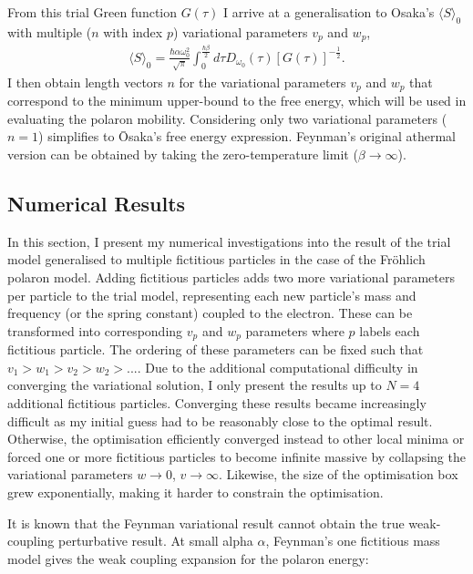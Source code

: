 From this trial Green function $G(\tau)$ I arrive at a generalisation to Osaka's $\langle S \rangle_0$ with multiple ($n$ with index $p$) variational parameters $v_{p}$ and $w_{p}$, 
\begin{equation}
\begin{gathered}
    \langle S \rangle_0 = \frac{\hbar \alpha \omega_0^2}{\sqrt{\pi}} \int_0^{\frac{\hbar\beta}{2}} d\tau D_{\omega_0}(\tau) \left[ G(\tau) \right]^{-\frac{1}{2}} .
\label{eqn:B}
\end{gathered}
\end{equation}
I then obtain length vectors $n$ for the variational parameters $v_{p}$ and $w_{p}$ that correspond to the minimum upper-bound to the free energy, which will be used in evaluating the polaron mobility. Considering only two variational parameters ($n = 1$) simplifies to \=Osaka's free energy expression. Feynman's original athermal version can be obtained by taking the zero-temperature limit ($\beta \rightarrow \infty$).

\subsection{Numerical Results}

In this section, I present my numerical investigations into the result of the trial model generalised to multiple fictitious particles in the case of the Fr\"ohlich polaron model. Adding fictitious particles adds two more variational parameters per particle to the trial model, representing each new particle's mass and frequency (or the spring constant) coupled to the electron. These can be transformed into corresponding $v_p$ and $w_p$ parameters where $p$ labels each fictitious particle. The ordering of these parameters can be fixed such that $v_1 > w_1 > v_2 > w_2 > ...$. Due to the additional computational difficulty in converging the variational solution, I only present the results up to $N=4$ additional fictitious particles. Converging these results became increasingly difficult as my initial guess had to be reasonably close to the optimal result. Otherwise, the optimisation efficiently converged instead to other local minima or forced one or more fictitious particles to become infinite massive by collapsing the variational parameters $w \to 0$, $v \to \infty$. Likewise, the size of the optimisation box grew exponentially, making it harder to constrain the optimisation.

It is known that the Feynman variational result cannot obtain the true weak-coupling perturbative result. At small alpha $\alpha$, Feynman's one fictitious mass model gives the weak coupling expansion for the polaron energy:

